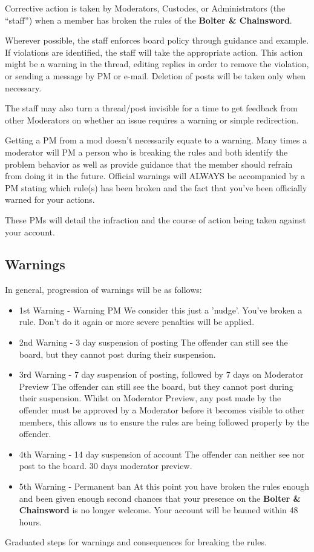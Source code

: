 \documentclass[12pt]{article}
\newcommand{\bnc}{{\textbf{Bolter \& Chainsword}}}%
\begin{document}
Corrective action is taken by Moderators, Custodes, or Administrators 
(the ``staff'') when a member has broken the rules of the {\bnc}.

Wherever possible, the staff enforces board policy through guidance and 
example. If violations are identified, the staff will take the 
appropriate action. This action might be a warning in the thread, 
editing replies in order to remove the violation, or sending a message 
by PM or e-mail. Deletion of posts will be taken only when necessary.

The staff may also turn a thread/post invisible for a time to get 
feedback from other Moderators on whether an issue requires a warning 
or simple redirection.

Getting a PM from a mod doesn't necessarily equate to a warning. Many 
times a moderator will PM a person who is breaking the rules and both 
identify the problem behavior as well as provide guidance that the 
member should refrain from doing it in the future. Official warnings 
will ALWAYS be accompanied by a PM stating which rule(s) has been 
broken and the fact that you've been officially warned for your actions.

These PMs will detail the infraction and the course of action being 
taken against your account.

\subsection{Warnings}

In general, progression of warnings will be as follows:

\begin{table}[H]

\begin{itemize}

\item 1st Warning - Warning PM
We consider this just a 'nudge'. You've broken a rule. Don't do it 
again or more severe penalties will be applied.
\item 2nd Warning - 3 day suspension of posting
The offender can still see the board, but they cannot post during their 
suspension.
\item 3rd Warning - 7 day suspension of posting, followed by 7 days on 
Moderator Preview
The offender can still see the board, but they cannot post during their 
suspension. Whilst on Moderator Preview, any post made by the offender 
must be approved by a Moderator before it becomes visible to other 
members, this allows us to ensure the rules are being followed properly 
by the offender.
\item 4th Warning - 14 day suspension of account
The offender can neither see nor post to the board. 30 days moderator 
preview.
\item 5th Warning - Permanent ban
At this point you have broken the rules enough and been given enough 
second chances that your presence on the {\bnc} is no longer welcome. Your 
account will be banned within 48 hours.
\end{itemize}
 \caption{Graduated steps for warnings and consequences for breaking the rules.}
\end{table}
\end{document}
